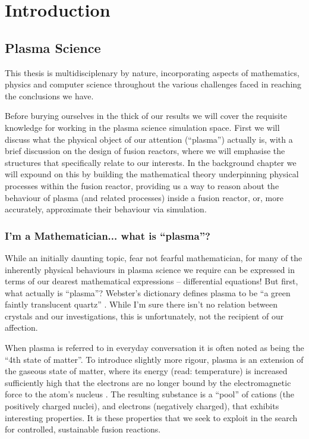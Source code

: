 
\chapter{Introduction}
\label{chapter1}

\section{Plasma Science}

This thesis is multidisciplenary by nature, incorporating aspects of mathematics, physics and computer science throughout 
the various challenges faced in reaching the conclusions we have. 


Before burying ourselves in the thick of our results we 
will cover the requisite knowledge for working in the plasma science simulation space. First we will discuss what 
the physical object of our attention (``plasma'') actually is, with a brief discussion on the design of fusion reactors, where we will 
emphasise the structures that specifically relate to our interests. In the background chapter we will expound on this by 
building the mathematical theory underpinning physical processes within the fusion reactor, providing us a way to reason
about the behaviour of plasma (and related processes) inside a fusion reactor, or, more accurately, approximate their behaviour 
via simulation.




\subsection{I'm a Mathematician... what is ``plasma''?}

While an initially daunting topic, fear not fearful mathematician, for many of the inherently physical 
behaviours in plasma science we require can be expressed in terms of our dearest mathematical expressions -- differential equations! 
But first, what actually is ``plasma''? Webster's dictionary defines plasma to be ``a green faintly translucent quartz'' \cite{websters_plasma}. 
While I'm sure there isn't no relation between crystals and our investigations, this is unfortunately, not the recipient of our affection. 

When plasma is referred to in everyday conversation it is often noted as being the ``4th state of matter''. To introduce slightly more rigour,
plasma is an extension of the gaseous state of matter, where its energy (read: temperature) is increased sufficiently high that the electrons 
are no longer bound by the electromagnetic force to the atom's nucleus \cite{basics-of-plasma-astrophysics}. The resulting substance is a ``pool'' of cations (the positively charged nuclei), and 
electrons (negatively charged), that exhibits interesting properties. It is these properties that we seek to exploit in the search for controlled, 
sustainable fusion reactions.

